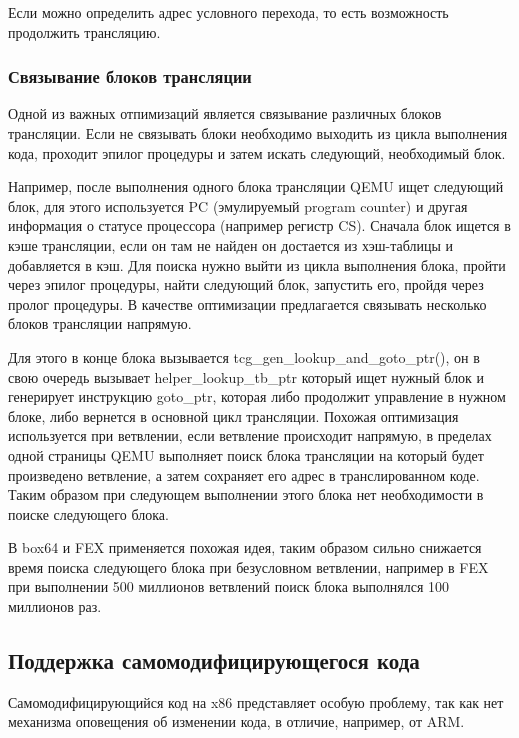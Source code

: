Если можно определить адрес условного перехода, то есть возможность продолжить трансляцию. \cite{fex_front}

\subsubsection{Связывание блоков трансляции}

Одной из важных отпимизаций является связывание различных блоков трансляции. Если не связывать блоки необходимо выходить из цикла выполнения кода, проходит эпилог процедуры и затем искать следующий, необходимый блок.

Например, после выполнения одного блока трансляции QEMU ищет следующий блок, для этого используется PC (эмулируемый program counter) и другая информация о статусе процессора (например регистр CS). Сначала блок ищется в кэше трансляции, если он там не найден он достается из хэш-таблицы и добавляется в кэш. Для поиска нужно выйти из цикла выполнения блока, пройти через эпилог процедуры, найти следующий блок, запустить его, пройдя через пролог процедуры. В качестве оптимизации предлагается связывать несколько блоков трансляции напрямую.

Для этого в конце блока вызывается tcg\_gen\_lookup\_and\_goto\_ptr(), он в свою очередь вызывает helper\_lookup\_tb\_ptr который ищет нужный блок и генерирует инструкцию goto\_ptr, которая либо продолжит управление в нужном блоке, либо вернется в основной цикл трансляции. Похожая оптимизация используется при ветвлении, если ветвление происходит напрямую, в пределах одной страницы QEMU выполняет поиск блока трансляции на который будет произведено ветвление, а затем сохраняет его адрес в транслированном коде. Таким образом при следующем выполнении этого блока нет необходимости в поиске следующего блока. \cite{qemu_docs}

В box64 и FEX применяется похожая идея, таким образом сильно снижается время поиска следующего блока при безусловном ветвлении, например в FEX при выполнении 500 миллионов ветвлений поиск блока выполнялся 100 миллионов раз. \cite{fex_video}

\subsection{Поддержка самомодифицирующегося кода}

Самомодифицирующийся код на x86 представляет особую проблему, так как нет механизма оповещения об изменении кода, в отличие, например, от ARM.

